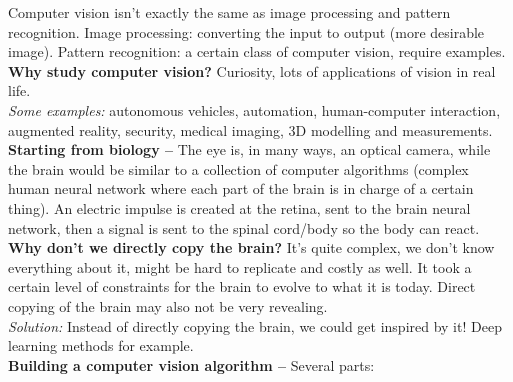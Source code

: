 \documentclass[a4paper,11pt]{article}
\begin{document}
Computer vision isn't exactly the same as image processing and pattern recognition. Image processing: converting the input to output (more desirable image). Pattern recognition: a certain class of computer vision, require examples. \vspace{5pt}\\
\textbf{Why study computer vision?} Curiosity, lots of applications of vision in real life.\\
\textit{Some examples:} autonomous vehicles, automation, human-computer interaction, augmented reality, security, medical imaging, 3D modelling and measurements.\vspace{5pt}\\
\textbf{Starting from biology --} The eye is, in many ways, an optical camera, while the brain would be similar to a collection of computer algorithms (complex human neural network where each part of the brain is in charge of a certain thing). An electric impulse is created at the retina, sent to the brain neural network, then a signal is sent to the spinal cord/body so the body can react.\vspace{5pt}\\
\textbf{Why don't we directly copy the brain?} It's quite complex, we don't know everything about it, might be hard to replicate and costly as well. It took a certain level of constraints for the brain to evolve to what it is today. Direct copying of the brain may also not be very revealing.\\
\textit{Solution:} Instead of directly copying the brain, we could get inspired by it! Deep learning methods for example.\vspace{5pt}\\
\textbf{Building a computer vision algorithm --} Several parts:
\end{document}
